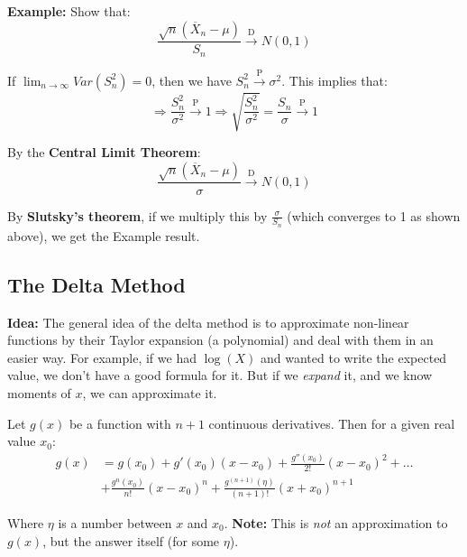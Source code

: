 \documentclass{article}
\begin{document}
\begin{enumerate}
    \textbf{Example:} Show that:
    \begin{equation*}
        \frac{\sqrt{n}(\overline{X}_n - \mu)}{S_n} \xrightarrow{\text{D}} N(0,1)
    \end{equation*}
    
    If $\lim_{n\to\infty} Var(S_n^2) = 0$, then we have $S_n^2 \xrightarrow{\text{P}} \sigma^2$. This implies that:
    \begin{equation*}
        \Rightarrow \frac{S_n^2}{\sigma^2} \xrightarrow{\text{P}} 1 \Rightarrow \sqrt{\frac{S_n^2}{\sigma^2}} = \frac{S_n}{\sigma} \xrightarrow{\text{P}} 1
    \end{equation*}
    
    By the \textbf{Central Limit Theorem}:
    \begin{equation*}
        \frac{\sqrt{n}(\overline{X}_n -\mu) }{\sigma} \xrightarrow{\text{D}} N(0,1)
    \end{equation*}
    
    By \textbf{Slutsky's theorem}, if we multiply this by $\frac{\sigma}{S_n}$ (which converges to 1 as shown above), we get the Example result.
\end{enumerate}

\subsection{The Delta Method}

\textbf{Idea:} The general idea of the delta method is to approximate non-linear functions by their Taylor expansion (a  polynomial) and deal with them in an easier way. For example, if we had $\log(X)$ and wanted to write the expected value, we don't have a good formula for it. But if we \textit{expand} it, and we know moments of $x$, we can approximate it.

Let $g(x)$ be a function with $n+1$ continuous derivatives. Then for a given real value $x_0$:
\begin{equation*}
\begin{split}
    g(x) &= g(x_0) + g'(x_0)(x-x_0) + \frac{g''(x_0)}{2!}(x-x_0)^2 + \dots \\
    &+ \frac{g^n(x_0)}{n!}(x-x_0)^n + \frac{g^{(n+1)}(\eta)}{(n+1)!}(x+x_0)^{n+1}
    \end{split}
\end{equation*}

Where $\eta$ is a number between $x$ and $x_0$. \textbf{Note:} This is \textit{not} an approximation to $g(x)$, but the answer itself (for some $\eta$).
\end{document}
